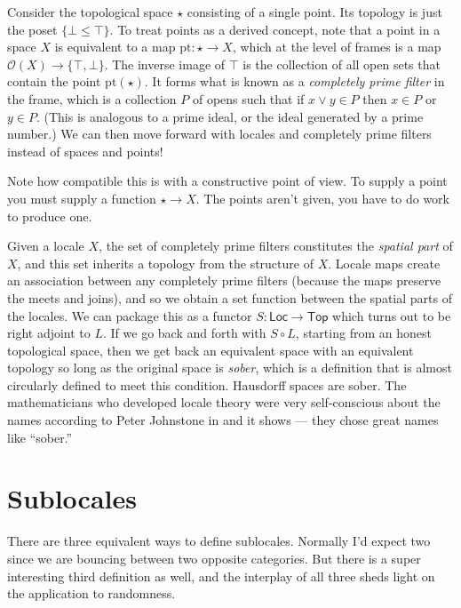 \documentclass[12pt]{extarticle}
\newcommand{\Locale}{\ensuremath{\mathsf{Loc}}}
\newcommand{\Topcat}{\ensuremath{\mathsf{Top}}}
\renewcommand{\o}{\ensuremath{\mathcal{O}}}
\begin{document}
Consider the topological space $\star$ consisting of a single point. Its topology is just the poset $\{\bot \leq \top\}$. To treat points as a derived concept, note that a point in a space $X$ is equivalent to a map $\mathrm{pt}:\star\to X$, which at the level of frames is a map $\o(X)\to\{\top, \bot\}$. The inverse image of $\top$ is the collection of all open sets that contain the point $\mathrm{pt}(\star)$. It forms what is known as a \emph{completely prime filter} in the frame, which is a collection $P$ of opens such that if $x\vee y\in P$ then $x\in P$ or $y\in P$. (This is analogous to a prime ideal, or the ideal generated by a prime number.) We can then move forward with locales and completely prime filters instead of spaces and points!

Note how compatible this is with a constructive point of view. To supply a point you must supply a function $\star\to X$. The points aren't given, you have to do work to produce one.

Given a locale $X$, the set of completely prime filters constitutes the \emph{spatial part} of $X$, and this set inherits a topology from the structure of $X$. Locale maps create an association between any completely prime filters (because the maps preserve the meets and joins), and so we obtain a set function between the spatial parts of the locales. We can package this as a functor $S:\Locale\to\Topcat$ which turns out to be right adjoint to $L$. If we go back and forth with $S\circ L$, starting from an honest topological space, then we get back an equivalent space with an equivalent topology so long as the original space is \emph{sober}, which is a definition that is almost circularly defined to meet this condition. Hausdorff spaces are sober. The mathematicians who developed locale theory were very self-conscious about the names according to Peter Johnstone in \cite{johnstone2} and it shows --- they chose great names like ``sober.''

\section{Sublocales}

There are three equivalent ways to define sublocales. Normally I'd expect two since we are bouncing between two opposite categories. But there is a super interesting third definition as well, and the interplay of all three sheds light on the application to randomness.
\end{document}
